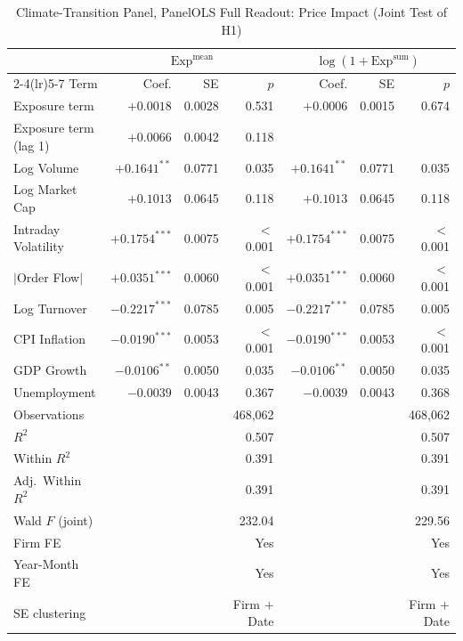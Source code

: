 \begin{table}[htbp]
\centering
\caption{Climate-Transition Panel, PanelOLS Full Readout: Price Impact (Joint Test of H1)}
\label{tab:v2_priceimpact}
\begin{threeparttable}
\small
\setlength{\tabcolsep}{4pt}
\begin{tabular}{l r r r r r r}
\toprule
 & \multicolumn{3}{c}{$\mathrm{Exp}^{\text{mean}}$} & \multicolumn{3}{c}{$\log(1+\mathrm{Exp}^{\text{sum}})$} \\
\cmidrule(lr){2-4}\cmidrule(lr){5-7}
Term & Coef. & SE & $p$ & Coef. & SE & $p$ \\
\midrule
Exposure term & $+0.0018$ & 0.0028 & 0.531 & $+0.0006$ & 0.0015 & 0.674 \\
Exposure term (lag 1)\tnote{a} & $+0.0066$ & 0.0042 & 0.118 & & & \\
Log Volume & $+0.1641^{**}$ & 0.0771 & 0.035 & $+0.1641^{**}$ & 0.0771 & 0.035 \\
Log Market Cap & $+0.1013$ & 0.0645 & 0.118 & $+0.1013$ & 0.0645 & 0.118 \\
Intraday Volatility & $+0.1754^{***}$ & 0.0075 & $<$0.001 & $+0.1754^{***}$ & 0.0075 & $<$0.001 \\
$|$Order Flow$|$ & $+0.0351^{***}$ & 0.0060 & $<$0.001 & $+0.0351^{***}$ & 0.0060 & $<$0.001 \\
Log Turnover & $-0.2217^{***}$ & 0.0785 & 0.005 & $-0.2217^{***}$ & 0.0785 & 0.005 \\
CPI Inflation & $-0.0190^{***}$ & 0.0053 & $<$0.001 & $-0.0190^{***}$ & 0.0053 & $<$0.001 \\
GDP Growth & $-0.0106^{**}$ & 0.0050 & 0.035 & $-0.0106^{**}$ & 0.0050 & 0.035 \\
Unemployment & $-0.0039$ & 0.0043 & 0.367 & $-0.0039$ & 0.0043 & 0.368 \\
\midrule
Observations & & & 468,062 & & & 468,062 \\
$R^2$ & & & 0.507 & & & 0.507 \\
Within $R^2$ & & & 0.391 & & & 0.391 \\
Adj.\ Within $R^2$ & & & 0.391 & & & 0.391 \\
Wald $F$ (joint) & & & 232.04 & & & 229.56 \\
Firm FE & & & Yes & & & Yes \\
Year-Month FE & & & Yes & & & Yes \\
SE clustering & & & Firm $+$ Date & & & Firm $+$ Date \\
\bottomrule
\end{tabular}

\end{threeparttable}
\end{table}
